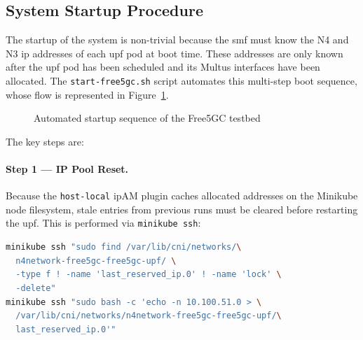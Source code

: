 \subsection{System Startup Procedure}
\label{sec:startup}

The startup of the system is non-trivial because the \gls{smf} must know the N4 and N3 \gls{ip} addresses of each \gls{upf} pod at boot time. These addresses are only known after the \gls{upf} pod has been scheduled and its Multus interfaces have been allocated. The \texttt{start-free5gc.sh} script automates this multi-step boot sequence, whose flow is represented in Figure~\ref{fig:startup_flow}.

\begin{figure}[H]
  \centering
  \caption{Automated startup sequence of the Free5GC testbed}
  \label{fig:startup_flow}
\end{figure}

The key steps are:

\paragraph{Step 1 — IP Pool Reset.} Because the \texttt{host-local} \gls{ip}AM plugin caches allocated addresses on the Minikube node filesystem, stale entries from previous runs must be cleared before restarting the \gls{upf}. This is performed via \texttt{minikube ssh}:

\begin{lstlisting}[language=bash, caption={Flushing host-local IPAM caches for UPF interfaces}, label={lst:ipam_flush}]
minikube ssh "sudo find /var/lib/cni/networks/\
  n4network-free5gc-free5gc-upf/ \
  -type f ! -name 'last_reserved_ip.0' ! -name 'lock' \
  -delete"
minikube ssh "sudo bash -c 'echo -n 10.100.51.0 > \
  /var/lib/cni/networks/n4network-free5gc-free5gc-upf/\
  last_reserved_ip.0'"
\end{lstlisting}

